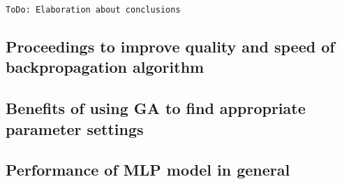 \texttt{ToDo: Elaboration about conclusions}

\subsection{Proceedings to improve quality and speed of backpropagation algorithm}

\subsection{Benefits of using GA to find appropriate parameter settings}

\subsection{Performance of MLP model in general}